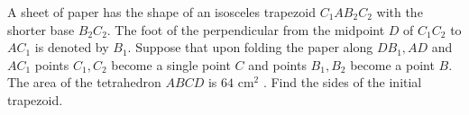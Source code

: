 A sheet of paper has the shape of an isosceles trapezoid $C_1AB_2C_2$ with the shorter base $B_2C_2$. The foot of the perpendicular from the midpoint $D$ of $C_1C_2$ to $AC_1$ is denoted by $B_1$. Suppose that upon folding the paper along $DB_1, AD$ and $AC_1$ points $C_1,C_2$ become a single point $C$ and points $B_1,B_2$ become a point $B$. The area of the tetrahedron $ABCD$ is $64$ cm$^2$ . Find the sides of the initial trapezoid.
